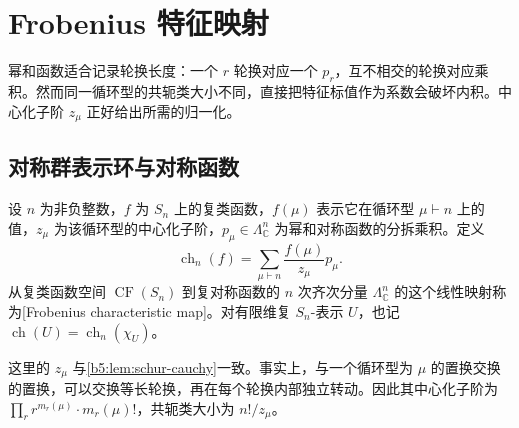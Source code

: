 \section{Frobenius 特征映射}
\label{b5:sec:0702}

幂和函数适合记录轮换长度：一个 \(r\) 轮换对应一个 \(p_r\)，互不相交的轮换对应乘积。然而同一循环型的共轭类大小不同，直接把特征标值作为系数会破坏内积。中心化子阶 \(z_\mu\) 正好给出所需的归一化。

\subsection{对称群表示环与对称函数}
\label{b5:subsec:0702:01}

\begin{definition}\label{b5:def:frobenius-characteristic}
	设 \(n\) 为非负整数，\(f\) 为 \(S_n\) 上的复类函数，\(f(\mu)\) 表示它在循环型 \(\mu\vdash n\) 上的值，\(z_\mu\) 为该循环型的中心化子阶，\(p_\mu\in\Lambda_{\mathbb C}^n\) 为幂和对称函数的分拆乘积。定义
	\[
		\operatorname{ch}_n(f) =\sum_{\mu\vdash n}\frac{f(\mu)}{z_\mu}p_\mu.
	\]
	从复类函数空间 \(\operatorname{CF}(S_n)\) 到复对称函数的 \(n\) 次齐次分量 \(\Lambda_{\mathbb C}^n\) 的这个线性映射称为[Frobenius characteristic map]。对有限维复 \(S_n\)-表示 \(U\)，也记 \(\operatorname{ch}(U)=\operatorname{ch}_n(\chi_U)\)。
\end{definition}

这里的 \(z_\mu\) 与\cref{b5:lem:schur-cauchy}一致。事实上，与一个循环型为 \(\mu\) 的置换交换的置换，可以交换等长轮换，再在每个轮换内部独立转动。因此其中心化子阶为 \(\prod_r r^{m_r(\mu)}\cdot m_r(\mu)!\)，共轭类大小为 \(n!/z_\mu\)。

